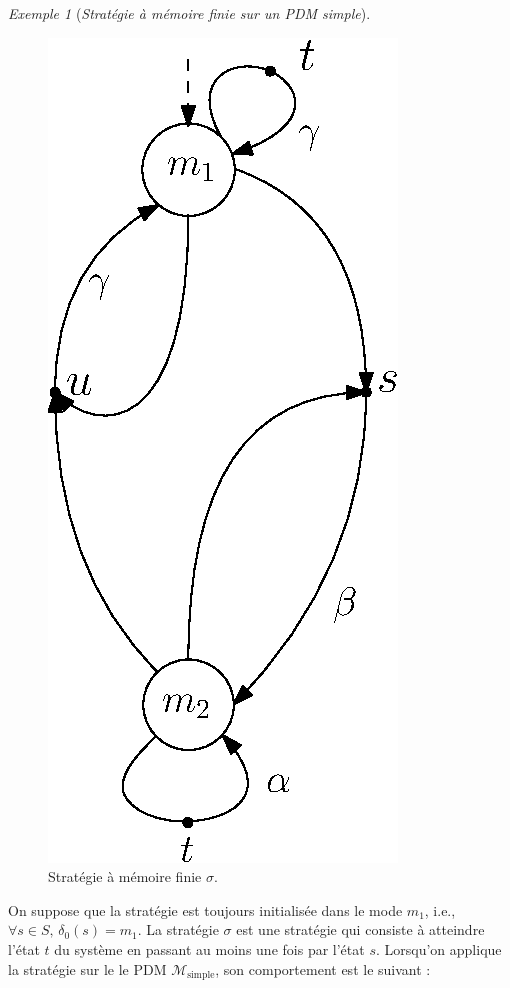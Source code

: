 \documentclass[12pt,a4paper]{report}
\theoremstyle{definition}%
\theoremstyle{remark}
\newtheorem{example}{Exemple}[chapter]
\begin{document}
\begin{example}[\textit{Stratégie à mémoire finie sur un PDM simple}]
\begin{figure}[h]
\begin{minipage}[t][][b]{0.45\textwidth}
			\includegraphics[scale=0.6]{figures/finite_scheduler2}
			\caption{Stratégie à mémoire finie $\sigma$.}
			\label{finite_s2}
		\end{minipage}
	\end{figure}
	On suppose que la stratégie est toujours initialisée dans le mode $m_1$, i.e., $\forall s \in S, \, \delta_0(s) = m_1$.
 La stratégie $\sigma$ est une stratégie qui consiste à atteindre l'état
 $t$ du système en passant au moins une fois par l'état $s$. Lorsqu'on
 applique la stratégie sur le le PDM $\mathcal{M}_{\text{simple}}$, son
 comportement est le suivant :
 \begin{enumerate}

\end{enumerate}
\end{example}
\end{document}
